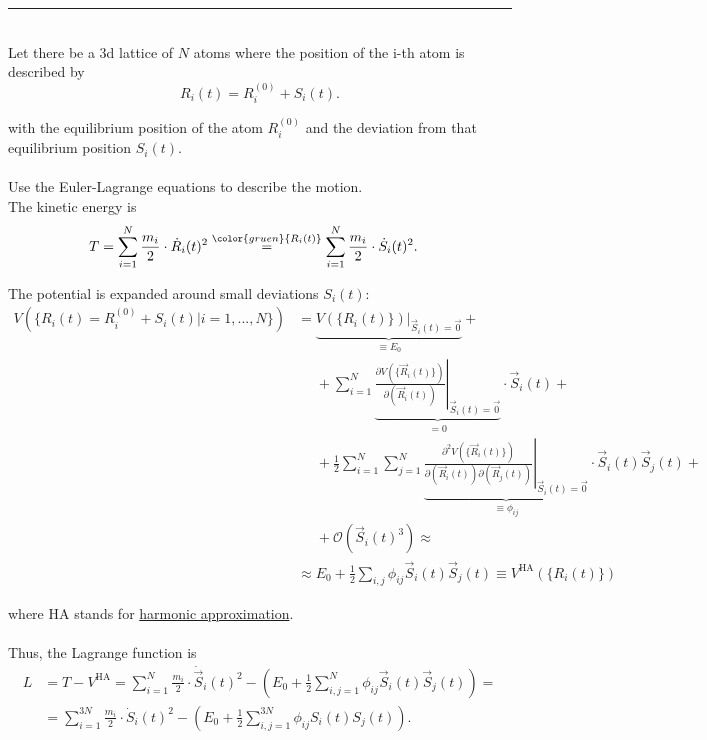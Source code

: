 \documentclass{article}
\newcommand{\lr}[1]{\left(#1\right)}
\newcommand{\comment}[1]{{\color{gruen} {#1}}}
\begin{document}
{\color{violet}
\hrule
	\\
	Let there be a 3d lattice of $N$ atoms where the position of the i-th atom is described by
		$$R_i(t) = R_i^{(0)} + S_i(t).$$
	
	with the equilibrium position of the atom $R_i^{(0)}$ and the deviation from that equilibrium position $S_i(t)$.\\
\\
	Use the Euler-Lagrange equations to describe the motion.\\
	The kinetic energy is
		\begin{align*}
			T &= \sum_{i=1}^N \frac{m_i}{2} \cdot \dot{R}_i(t)^2 \stackrel{ \comment{R_i(t)} }{=} \sum_{i=1}^N \frac{m_i}{2} \cdot \dot{S}_i(t)^2.
		\end{align*}	

	The potential is expanded around small deviations $S_i(t)$:
		\begin{align*}
			V(\{R_i(t) = R_i^{(0)} + S_i(t) | i=1,...,N\}) &= \underbrace{ \left. V(\{R_i(t)\}) \right|_{\vec{S}_i(t) = \vec{0}} }_{\equiv E_0} + \\
			&\phantom{=} + \sum_{i=1}^N \underbrace{ \left. \frac{\partial V(\{\vec{R}_i(t)\})}{\partial(\vec{R}_i(t))} \right|_{\vec{S}_i(t) = \vec{0}} }_{=0} \cdot \vec{S}_i(t) + \\
			&\phantom{=} + \frac{1}{2} \sum_{i=1}^N \sum_{j=1}^N \underbrace{ \left. \frac{\partial^2 V(\{\vec{R}_i(t)\})}{\partial(\vec{R}_i(t)) \partial(\vec{R}_j(t))} \right|_{\vec{S}_i(t) = \vec{0}} }_{\equiv \phi_{ij}} \cdot \vec{S}_i(t) \vec{S}_j(t) + \\
			&\phantom{=} + \mathcal{O}(\vec{S}_i(t)^3) \approx \\
			&\approx E_0 + \frac{1}{2} \sum_{i,j} \phi_{ij} \vec{S}_i(t) \vec{S}_j(t) \equiv V^\text{HA}(\{R_i(t)\})
		\end{align*}
	
	where HA stands for \underline{harmonic approximation}.\\
	\\
	Thus, the Lagrange function is
		\begin{align*}
			L &= T - V^\text{HA} = \sum_{i=1}^N \frac{m_i}{2} \cdot \dot{\vec{S}}_i(t)^2 - \lr{ E_0 + \frac{1}{2} \sum_{i,j=1}^N \phi_{ij} \vec{S}_i(t) \vec{S}_j(t) } = \\
			&= \sum_{i=1}^{3N} \frac{m_i}{2} \cdot \dot{S}_i(t)^2 - \lr{ E_0 + \frac{1}{2} \sum_{i,j=1}^{3N} \phi_{ij} S_i(t) S_j(t) }.
		\end{align*}

}
\end{document}
